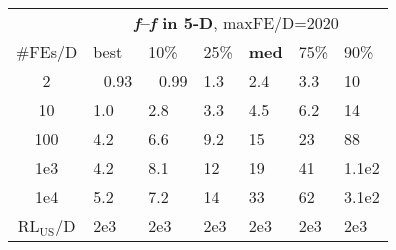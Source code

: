 \begin{tabular}{c|llllll}
 & \multicolumn{6}{|c}{\textbf{\textit{f}\raisebox{-0.35ex}{1}--\textit{f}\raisebox{-0.35ex}{24} in 5-D}, maxFE/D=2020}\\
\#FEs/D & best & 10\% & 25\% & \textbf{med} & 75\% & 90\%\\
2 & ~\,0.93 & ~\,0.99 & \hspace*{1ex}1.3 & \hspace*{1ex}2.4 & \hspace*{1ex}3.3 & 10\\
10 & \hspace*{1ex}1.0 & \hspace*{1ex}2.8 & \hspace*{1ex}3.3 & \hspace*{1ex}4.5 & \hspace*{1ex}6.2 & 14\\
100 & \hspace*{1ex}4.2 & \hspace*{1ex}6.6 & \hspace*{1ex}9.2 & 15 & 23 & 88\\
1e3 & \hspace*{1ex}4.2 & \hspace*{1ex}8.1 & 12 & 19 & 41 & 1.1e2\\
1e4 & \hspace*{1ex}5.2 & \hspace*{1ex}7.2 & 14 & 33 & 62 & 3.1e2\\
$\text{RL}_{\text{US}}$/D & 2e3 & 2e3 & 2e3 & 2e3 & 2e3 & 2e3
\end{tabular}
